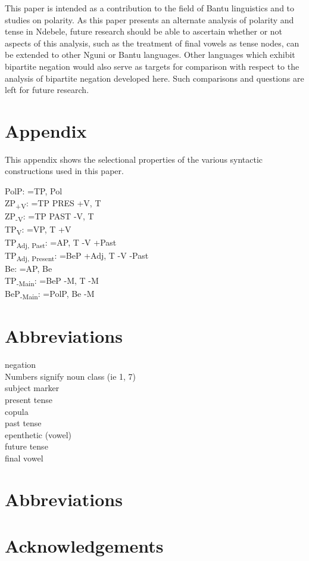 \documentclass[output=paper]{langsci/langscibook}
\begin{document}
This paper is intended as a contribution to the field of Bantu linguistics and to studies on polarity. As this paper presents an alternate analysis of polarity and tense in Ndebele, future research should be able to ascertain whether or not aspects of this analysis, such as the treatment of final vowels as tense nodes, can be extended to other Nguni or Bantu languages. Other languages which exhibit bipartite negation would also serve as targets for comparison with respect to the analysis of bipartite negation developed here. Such comparisons and questions are left for future research. 
\vspace{5 mm}

\section*{Appendix}

This appendix shows the selectional properties of the various  syntactic constructions used in this paper.

PolP: =TP, Pol
\\
ZP\textsubscript{+V}: =TP PRES +V, T 
\\
ZP\textsubscript{-V}: =TP PAST -V, T 
\\
TP\textsubscript{V}: =VP, T +V
\\
TP\textsubscript{Adj, Past}: =AP, T -V +Past
\\
TP\textsubscript{Adj, Present}: =BeP +Adj, T -V -Past
\\
Be: =AP, Be 
\\
TP\textsubscript{-Main}: =BeP -M, T -M
\\
BeP\textsubscript{-Main}: =PolP, Be -M


\section*{Abbreviations}

 \quad negation
\\
Numbers \quad signify noun class (ie 1, 7)
\\
 \quad subject marker
\\
 \quad present tense
\\
 \quad copula
\\
 \quad past tense
\\
 \quad epenthetic (vowel)
\\
 \quad future tense
\\
 \quad final vowel



\section*{Abbreviations}
\section*{Acknowledgements}

\printbibliography[heading=subbibliography,notkeyword=this]
\end{document}
